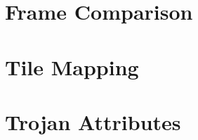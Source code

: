 \section{Frame Comparison} \label{sec:frameComparison}
\section{Tile Mapping} \label{sec:tileMapping}
\section{Trojan Attributes} \label{sec:trojanAttributes}



%
%
%
%
%
%
%
